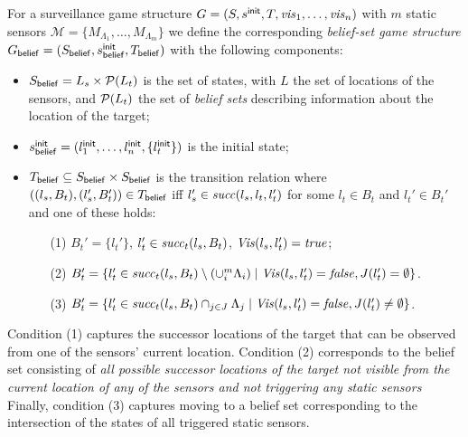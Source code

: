 For a surveillance game structure $G  = (S,s^{\mathsf{init}},T,\mathit{vis}_1,\ldots,\mathit{vis}_n)$ with $m$ static sensors $\mathcal{M} = \{M_{\Lambda_1},\dots,M_{\Lambda_m}\}$ we define the corresponding \emph{belief-set game structure} $G_{\mathsf{belief}}  = (S_{\mathsf{belief}},s^{\mathsf{init}}_{\mathsf{belief}},T_{\mathsf{belief}})$ with the following components:
\begin{itemize}
\item $S_{\mathsf{belief}} = L_s \times \mathcal{P}(L_t)$ is the set of states, with $L$ the set of locations of the sensors, and $\mathcal{P}(L_t)$ the set of \emph{belief sets} describing information about the location of the target;
\item $s^{\mathsf{init}}_{\mathsf{belief}} = (l^{\mathsf{init}}_1,\ldots,l^{\mathsf{init}}_n,\{l_t^{\mathsf{init}}\})$ is the initial state;
\item $T_{\mathsf{belief}} \subseteq S_{\mathsf{belief}} \times S_{\mathsf{belief}}$ is the transition relation where $((l_s, B_t),(l_s', B_t')) \in T_{\mathsf{belief}}$ iff $l_s' \in  \mathit{succ}(l_s,l_t,l_t')$ for some $l_t \in B_t$ and $l_t' \in B_t'$ and one of these holds:
\begin{itemize}
\item[(1)] $B_t' = \{l_t'\}$, $l_t' \in \mathit{succ}_t(l_s,B_t)$, $\mathit{Vis}(l_s,l_t') = \mathit{true}$;
\item[(2)] $B_t' = \{l_t' \in \mathit{succ}_t(l_s,B_t ) \setminus (\cup_{i}^m\Lambda_i)  \mid  \mathit{Vis}(l_s,l_t') = \mathit{false}, J(l_t') = \emptyset \}$.
\item[(3)] $B_t' = \{l_t' \in \mathit{succ}_t(l_s,B_t) \cap_{j\in J}\Lambda_j  \mid  \mathit{Vis}(l_s,l_t') = \mathit{false}, J(l_t') \neq \emptyset \}$.
\end{itemize}
\end{itemize}
Condition (1) captures the successor locations of the target that can be observed from one of the sensors' current location. Condition (2) corresponds to the belief set consisting of \emph{all possible successor locations of the target not visible from the current location of any of the sensors and not triggering any static sensors} Finally, condition (3) captures moving to a belief set corresponding to the intersection of the states of all triggered static sensors. 
